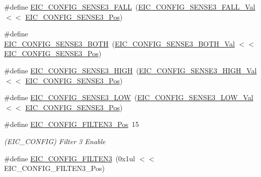 \begin{DoxyCompactItemize}
\item 
\#define \mbox{\hyperlink{group___s_a_m_d21___e_i_c_ga9f494d43bb1b2fd098c3acc91bd95bc2}{E\+I\+C\+\_\+\+C\+O\+N\+F\+I\+G\+\_\+\+S\+E\+N\+S\+E3\+\_\+\+F\+A\+LL}}~(\mbox{\hyperlink{group___s_a_m_d21___e_i_c_gaf4c91968458631be4fa57f3c0c15404c}{E\+I\+C\+\_\+\+C\+O\+N\+F\+I\+G\+\_\+\+S\+E\+N\+S\+E3\+\_\+\+F\+A\+L\+L\+\_\+\+Val}}    $<$$<$ \mbox{\hyperlink{group___s_a_m_d21___e_i_c_ga831aeaf54a89c732e999bddee6ad0cbf}{E\+I\+C\+\_\+\+C\+O\+N\+F\+I\+G\+\_\+\+S\+E\+N\+S\+E3\+\_\+\+Pos}})
\item 
\#define \mbox{\hyperlink{group___s_a_m_d21___e_i_c_ga14fc23701b9b6d750aac9c6fa9437907}{E\+I\+C\+\_\+\+C\+O\+N\+F\+I\+G\+\_\+\+S\+E\+N\+S\+E3\+\_\+\+B\+O\+TH}}~(\mbox{\hyperlink{group___s_a_m_d21___e_i_c_gaa8713c71e12ac27aed9182636e488bc6}{E\+I\+C\+\_\+\+C\+O\+N\+F\+I\+G\+\_\+\+S\+E\+N\+S\+E3\+\_\+\+B\+O\+T\+H\+\_\+\+Val}}    $<$$<$ \mbox{\hyperlink{group___s_a_m_d21___e_i_c_ga831aeaf54a89c732e999bddee6ad0cbf}{E\+I\+C\+\_\+\+C\+O\+N\+F\+I\+G\+\_\+\+S\+E\+N\+S\+E3\+\_\+\+Pos}})
\item 
\#define \mbox{\hyperlink{group___s_a_m_d21___e_i_c_ga578849e63e490e04dda9f78ec3674da1}{E\+I\+C\+\_\+\+C\+O\+N\+F\+I\+G\+\_\+\+S\+E\+N\+S\+E3\+\_\+\+H\+I\+GH}}~(\mbox{\hyperlink{group___s_a_m_d21___e_i_c_gac73c1ef1256ac37c4a05f3f3437ca87d}{E\+I\+C\+\_\+\+C\+O\+N\+F\+I\+G\+\_\+\+S\+E\+N\+S\+E3\+\_\+\+H\+I\+G\+H\+\_\+\+Val}}    $<$$<$ \mbox{\hyperlink{group___s_a_m_d21___e_i_c_ga831aeaf54a89c732e999bddee6ad0cbf}{E\+I\+C\+\_\+\+C\+O\+N\+F\+I\+G\+\_\+\+S\+E\+N\+S\+E3\+\_\+\+Pos}})
\item 
\#define \mbox{\hyperlink{group___s_a_m_d21___e_i_c_ga69a5938a46054fe30a1661c0194814ba}{E\+I\+C\+\_\+\+C\+O\+N\+F\+I\+G\+\_\+\+S\+E\+N\+S\+E3\+\_\+\+L\+OW}}~(\mbox{\hyperlink{group___s_a_m_d21___e_i_c_gacd770ca16cc8b9bd76408b1ab7391ff5}{E\+I\+C\+\_\+\+C\+O\+N\+F\+I\+G\+\_\+\+S\+E\+N\+S\+E3\+\_\+\+L\+O\+W\+\_\+\+Val}}     $<$$<$ \mbox{\hyperlink{group___s_a_m_d21___e_i_c_ga831aeaf54a89c732e999bddee6ad0cbf}{E\+I\+C\+\_\+\+C\+O\+N\+F\+I\+G\+\_\+\+S\+E\+N\+S\+E3\+\_\+\+Pos}})
\item 
\#define \mbox{\hyperlink{group___s_a_m_d21___e_i_c_gaf8ffa2628676573b96658108f610e95e}{E\+I\+C\+\_\+\+C\+O\+N\+F\+I\+G\+\_\+\+F\+I\+L\+T\+E\+N3\+\_\+\+Pos}}~15
\begin{DoxyCompactList}\small\item\em (E\+I\+C\+\_\+\+C\+O\+N\+F\+IG) Filter 3 Enable \end{DoxyCompactList}\item 
\#define \mbox{\hyperlink{group___s_a_m_d21___e_i_c_ga34cd2035be4ce980a8480e58c79d6dd1}{E\+I\+C\+\_\+\+C\+O\+N\+F\+I\+G\+\_\+\+F\+I\+L\+T\+E\+N3}}~(0x1ul $<$$<$ E\+I\+C\+\_\+\+C\+O\+N\+F\+I\+G\+\_\+\+F\+I\+L\+T\+E\+N3\+\_\+\+Pos)
$$
\end{DoxyCompactItemize}
